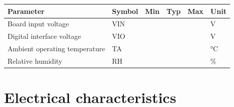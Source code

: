 \documentclass[10pt,a4paper,oneside]{report}
\begin{document}
{\def\LTcaptype{none} %
\begin{longtable}[]{@{}
  >{\raggedright\arraybackslash}p{}
  >{\raggedright\arraybackslash}p{}
  >{\raggedright\arraybackslash}p{}
  >{\raggedright\arraybackslash}p{}
  >{\raggedright\arraybackslash}p{}
  >{\raggedright\arraybackslash}p{}@{}}
\toprule\noalign{}
\begin{minipage}[b]{\linewidth}\raggedright
\textbf{Parameter}
\end{minipage} & \begin{minipage}[b]{\linewidth}\raggedright
\textbf{Symbol}
\end{minipage} & \begin{minipage}[b]{\linewidth}\raggedright
\textbf{Min}
\end{minipage} & \begin{minipage}[b]{\linewidth}\raggedright
\textbf{Typ}
\end{minipage} & \begin{minipage}[b]{\linewidth}\raggedright
\textbf{Max}
\end{minipage} & \begin{minipage}[b]{\linewidth}\raggedright
\textbf{Unit}
\end{minipage} \\
\midrule\noalign{}
\endhead
\bottomrule\noalign{}
\endlastfoot
Board input voltage & VIN & & & & V \\
Digital interface voltage & VIO & & & & V \\
Ambient operating temperature & TA & & & & °C \\
Relative humidity & RH & & & & \% \\
\end{longtable}
}

\section{Electrical characteristics}\label{wiki-hardware-electrical-ratings--electrical-characteristics}
\end{document}
